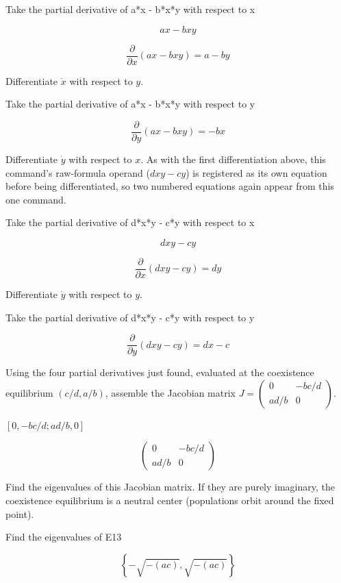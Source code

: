 \documentclass[dvipdfmx]{article}
\begin{document}
Take the partial derivative of a*x - b*x*y with respect to x

\begin{equation}
  a x - b x y
  \label{eq:E7}
\end{equation}

\begin{equation}
  \frac{\partial}{\partial x}\left(a x - b x y\right) = a-b y
  \label{eq:E8}
\end{equation}

Differentiate $\dot x$ with respect to $y$.

Take the partial derivative of a*x - b*x*y with respect to y

\begin{equation}
  \frac{\partial}{\partial y}\left(a x - b x y\right) = -b x
  \label{eq:E9}
\end{equation}

Differentiate $\dot y$ with respect to $x$. As with the first differentiation above, this command's raw-formula operand ($dxy-cy$) is registered as its own equation before being differentiated, so two numbered equations again appear from this one command.

Take the partial derivative of d*x*y - c*y with respect to x

\begin{equation}
  d x y - c y
  \label{eq:E10}
\end{equation}

\begin{equation}
  \frac{\partial}{\partial x}\left(d x y - c y\right) = d y
  \label{eq:E11}
\end{equation}

Differentiate $\dot y$ with respect to $y$.

Take the partial derivative of d*x*y - c*y with respect to y

\begin{equation}
  \frac{\partial}{\partial y}\left(d x y - c y\right) = d x-c
  \label{eq:E12}
\end{equation}

Using the four partial derivatives just found, evaluated at the coexistence equilibrium $(c/d,a/b)$, assemble the Jacobian matrix $J=\begin{pmatrix}0&-bc/d\\ad/b&0\end{pmatrix}$.

$[0, -b c/d; a d/b, 0]$

\begin{equation}
  \begin{pmatrix} 0 & -b c/d \\ a d/b & 0 \end{pmatrix}
  \label{eq:E13}
\end{equation}

Find the eigenvalues of this Jacobian matrix. If they are purely imaginary, the coexistence equilibrium is a neutral center (populations orbit around the fixed point).

Find the eigenvalues of E13

\begin{equation}
  \left\{ -\sqrt{-\left(a c\right)} , \sqrt{-\left(a c\right)} \right\}
  \label{eq:E14}
\end{equation}
\end{document}
